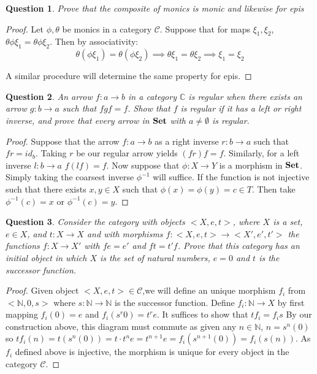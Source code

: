 \documentclass[12pt]{article}
\newtheorem{question}{Question}[section]
\theoremstyle{remark}
\begin{document}
\begin{question}
 Prove that the composite of monics is monic and likewise for epis
\end{question}
 
\begin{proof}
 Let $\phi,\theta$ be monics in a category $\mathcal{C}$. Suppose that for maps $\xi_1,\xi_2$, $\theta\phi \xi_1 = \theta\phi\xi_2$. Then by associativity:
 $$ \theta(\phi\xi_1) = \theta(\phi\xi_2) \implies \theta \xi_1= \theta \xi_2 \implies \xi_1 = \xi_2$$
 
 A similar procedure will determine the same property for epis.
\end{proof}

\begin{question}
 An arrow $f: a \rightarrow b$ in a category $\mathbb{C}$ is regular when there exists an arrow $g: b \rightarrow a$ such that $fgf = f$. Show that $f$ is regular if it has a left or right inverse, and prove that every arrow in ${\bf Set}$ with $a \neq \emptyset$ is regular.
\end{question}

\begin{proof}
Suppose that the arrow $f: a \rightarrow b$ as a right inverse $r:b \rightarrow a$ such that $fr = id_b$. Taking $r$ be our regular arrow yields $(fr)f = f$. Similarly, for a left inverse $l: b \rightarrow a$ $f(lf) = f$. Now suppose that $\phi: X \rightarrow Y$ is a morphism in ${\bf Set}$. Simply taking the coarsest inverse $\phi^{-1}$ will suffice. If the function is not injective such that there exists $x,y \in X$ such that $\phi(x) = \phi(y) = c \in T$. Then take $\phi^{-1}(c) = x$ or $\phi^{-1}(c) = y$. 
\end{proof}

\begin{question}
 Consider the category with objects $<X,e,t>$, where $X$ is a set, $e \in X$, and $t:X \rightarrow X$ and with morphisms $f:<X,e,t> \rightarrow <X',e',t'>$ the functions $f: X \rightarrow X'$ with $fe = e'$ and $ft = t'f$. Prove that this category has an initial object in which $X$ is the set of natural numbers, $e =0$ and $t$ is the successor function.
\end{question}

\begin{proof}
 Given object $<X,e,t> \in \mathcal{C}$,we will define an unique morphism $f_i$ from $<\mathbb{N},0,s>$ where $s:\mathbb{N} \rightarrow \mathbb{N}$ is the successor function. Define $f_i: \mathbb{N} \rightarrow X$ by first mapping 
 $f_i(0) = e$ and $f_i(s^r0) = t^re$. It suffices to show that $tf_i = f_is$ By our construction above, this diagram must commute as given any $n \in \mathbb{N}$, $n = s^n(0)$ so $tf_i(n) = t(s^n(0)) = t\cdot t^ne = t^{n+1}e = f_i(s^{n+1}(0)) = f_i(s(n))$. As $f_i$ defined above is injective, the morphism is unique for every object in the category $\mathcal{C}$.
\end{proof}


 
 
\end{document}
